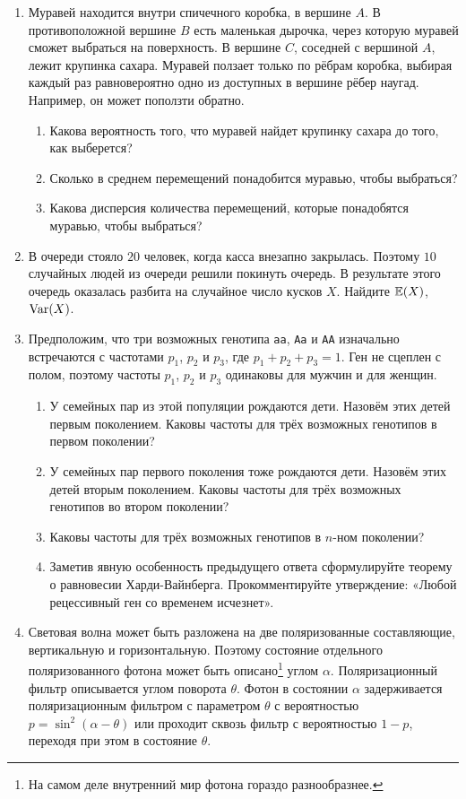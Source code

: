 \begin{enumerate}
\item Муравей находится внутри спичечного коробка, в вершине $A$. В противоположной
вершине $B$ есть маленькая дырочка, через которую муравей сможет выбраться на поверхность.
В вершине $C$, соседней с вершиной $A$, лежит крупинка сахара. Муравей ползает
только по рёбрам коробка, выбирая каждый раз равновероятно одно из доступных в
вершине рёбер наугад. Например, он может поползти обратно.
\begin{enumerate}
\item Какова вероятность того, что муравей найдет крупинку сахара до того, как выберется?
\item Сколько в среднем перемещений понадобится муравью, чтобы выбраться?
\item Какова дисперсия количества перемещений, которые понадобятся муравью, чтобы
выбраться?
\end{enumerate}

\item В очереди стояло $20$ человек, когда касса внезапно закрылась. Поэтому $10$
случайных людей из очереди решили покинуть очередь. В результате этого очередь
оказалась разбита на случайное число кусков $X$. Найдите $\operatorname{\mathbb{E}}(X)$, $\operatorname{Var}(X)$.

\item Предположим, что три возможных генотипа \verb|aa|, \verb|Aa| и \verb|AA|
изначально встречаются с частотами $p_1$, $p_2$ и $p_3$, где $p_1 + p_2 + p_3 = 1$.
Ген не сцеплен с полом, поэтому частоты $p_1$, $p_2$ и $p_3$ одинаковы для мужчин
и для женщин.
\begin{enumerate}
\item У семейных пар из этой популяции рождаются дети. Назовём этих детей первым
поколением. Каковы частоты для трёх возможных генотипов в первом поколении?
\item У семейных пар первого поколения тоже рождаются дети. Назовём этих детей
вторым поколением. Каковы частоты для трёх возможных генотипов во втором поколении?
\item Каковы частоты для трёх возможных генотипов в $n$-ном поколении?
\item Заметив явную особенность предыдущего ответа сформулируйте теорему о равновесии
Харди-Вайнберга. Прокомментируйте утверждение: «Любой рецессивный ген со временем
исчезнет».
\end{enumerate}

\item Световая волна может быть разложена на две поляризованные составляющие,
вертикальную и горизонтальную. Поэтому состояние отдельного поляризованного фотона
может быть описано\footnote{На самом деле внутренний мир фотона гораздо разнообразнее.}
углом $\alpha$. Поляризационный фильтр описывается углом поворота $\theta$. Фотон
в состоянии $\alpha$ задерживается поляризационным фильтром с параметром $\theta$
с вероятностью $p=\sin^2(\alpha-\theta)$ или проходит сквозь фильтр с вероятностью
$1 - p$, переходя при этом в состояние $\theta$.


\end{enumerate}
